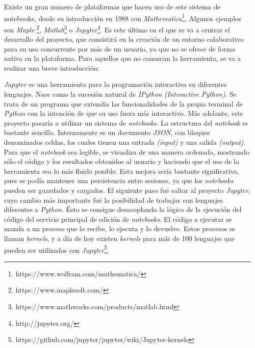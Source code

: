 \documentclass[11pt,spanish,listoffigures]{tfgetsinf}
\begin{document}
Existe un gran numero de plataformas que hacen uso de este sistema de notebooks, desde su introducción en 1988 con \textit{Mathematica}\footnote{https://www.wolfram.com/mathematica/}. Algunos ejemplos son \textit{Maple} \footnote{https://www.maplesoft.com/}, \textit{Matlab}\footnote{https://www.mathworks.com/products/matlab.html} o \textit{Jupyter}\footnote{http://jupyter.org/}. Es este último en el que se va a centrar el desarrollo del proyecto, que consistirá en la creación de un entorno colaborativo para su uso concurrente por más de un usuario, ya que no se ofrece de forma nativa en la plataforma. Para aquellos que no conozcan la herramienta, se va a realizar una breve introducción:

\textit{Jupyter } es una herramienta para la programación interactiva en diferentes lenguajes. Nace como la sucesión natural de \textit{IPython} \textit{(Interactive Python)}. Se trata de un programa que extendía las funcionalidades de la propia terminal de \textit{Python} con la intención de que su uso fuera más interactivo. Más adelante, este proyecto pasaría a utilizar un sistema de \textit{notebooks}. La estructura del \textit{notebook} es bastante sencilla. Internamente es un documento \textit{\gls{JSON}}, con bloques denominados celdas, los cuales tienen una entrada \textit{(input)} y una salida \textit{(output)}. Para que el \textit{notebook} sea legible, se visualiza de una manera ordenada, mostrando sólo el código y los resultados obtenidos al usuario y haciendo que el uso de la herramienta sea lo más fluido posible.   
Esta mejora sería bastante significativa, pues se podía mantener una persistencia entre sesiones, ya que los \textit{notebooks} pueden ser guardados y cargados. El siguiente paso fué saltar al proyecto \textit{Jupyter}, cuyo cambio más importante fué la posibilidad de trabajar con lenguajes diferentes a \textit{Python}. Ésto se consigue desacoplando la lógica de la ejecución del código del servicio principal de edición de \textit{notebooks}. El código a ejecutar se manda a un proceso que lo recibe, lo ejecuta y lo devuelve. Estos procesos se llaman \textit{kernels}, y a día de hoy existen \textit{kernels} para más de 100 lenguajes que pueden ser utilizados con \textit{Jupyter}\footnote{https://github.com/jupyter/jupyter/wiki/Jupyter-kernels}.
\end{document}
